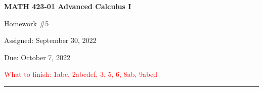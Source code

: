 \documentclass[10pt]{article}
\theoremstyle{definition}
\begin{document}
\pagestyle{empty}  %

\begin{center}  %

{\bf MATH 423-01  Advanced Calculus I

Homework \#5

Assigned: September 30, 2022

Due: October 7, 2022

\textcolor{red}{What to finish: 1abc, 2abcdef, 3, 5, 6, 8ab, 9abcd}
}

\end{center}

\medskip

\hrule   %

\bigskip

\end{document}
